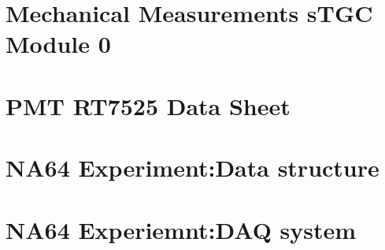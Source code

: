\section{Mechanical Measurements sTGC Module 0}
\section{PMT RT7525 Data Sheet}
\section{NA64 Experiment:Data structure}
\section{NA64 Experiemnt:DAQ system}

